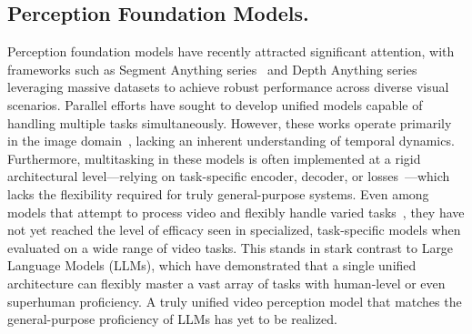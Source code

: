 \documentclass[11pt, a4paper, logo, onecolumn]{googledeepmind}
\begin{document}
\subsection{Perception Foundation Models.}
Perception foundation models have recently attracted significant attention, with frameworks such as Segment Anything series~\cite{kirillov2023segment,ravi2024sam,carion2025sam} and Depth Anything series~\cite{yang2024depth1,yang2024depth,lin2025depth} leveraging massive datasets to achieve robust performance across diverse visual scenarios. Parallel efforts have sought to develop unified models capable of handling multiple tasks simultaneously. However, these works operate primarily in the image domain~\cite{saleh2025david,mizrahi20234m,bachmann20244m}, lacking an inherent understanding of temporal dynamics. Furthermore, multitasking in these models is often implemented at a rigid architectural level—relying on task-specific encoder, decoder, or losses~\cite{saleh2025david}—which lacks the flexibility required for truly general-purpose systems.
Even among models that attempt to process video and flexibly handle varied tasks~\cite{zhu2022uni,huang2025unityvideo}, they have not yet reached the level of efficacy seen in specialized, task-specific models when evaluated on a wide range of video tasks.
This stands in stark contrast to Large Language Models (LLMs), which have demonstrated that a single unified architecture can flexibly master a vast array of tasks with human-level or even superhuman proficiency. A truly unified video perception model that matches the general-purpose proficiency of LLMs has yet to be realized.
\end{document}
